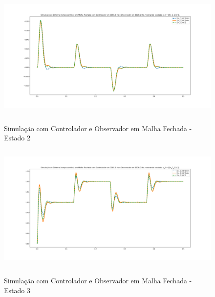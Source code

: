 \documentclass[
	12pt,				%
	article,			%
	openright,			%
	oneside,
	a4paper,			%
	chapter=TITLE,		%
	section=TITLE,		%
	english,			%
	french,				%
	spanish,			%
	brazil,				%
]{abntex2}
\begin{document}
\begin{apendicesenv}
        	\begin{figure}[htbp]
            	\centering
            	\caption{Simulação com Controlador e Observador em Malha Fechada - Estado 2}
            	\includegraphics[width=\textwidth,height=240px,keepaspectratio]{imgs/step_response_closedloop_observer_state2.png}
            	\label{fig-step_response_closedloop_observer_state2}
        	\end{figure}
        	
        	\begin{figure}[htbp]
            	\centering
            	\caption{Simulação com Controlador e Observador em Malha Fechada - Estado 3}
            	\includegraphics[width=\textwidth,height=240px,keepaspectratio]{imgs/step_response_closedloop_observer_state3.png}
            	\label{fig-step_response_closedloop_observer_state3}
        	\end{figure}
        	

\end{apendicesenv}
\end{document}
